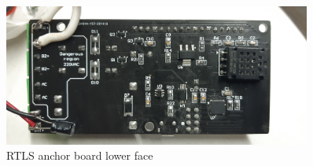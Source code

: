\documentclass[\main/main.tex]{subfiles}
\begin{document}
\begin{figure}[H]
    \begin{center}
        \includegraphics[width=0.9\textwidth]{rtls_anchor_hw_lower.jpg}
    \end{center}
    \caption{RTLS anchor board lower face}
    \label{fig:rtls_anchor_hw_lower}
\end{figure}
\end{document}
